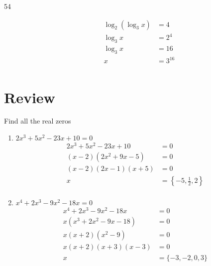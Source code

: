 \documentclass{exam}
\begin{document}
\begin{description}
        \item[54] 
          \begin{align*}
            \log_2 (\log_3 x) &= 4 \\
            \log_3 x          &= 2^4 \\
            \log_3 x          &= 16 \\
            x                 &= \boxed{3^{16}} \\
          \end{align*}

      \end{description}
    \fi

    \section{Review}

    Find all the real zeros
    \begin{enumerate}
      \item $2x^3 + 5x^2 - 23x + 10 = 0$
        \ifprintanswers
          \begin{align*}
            2x^3 + 5x^2 - 23x + 10                &= 0 \\
            (x - 2)\left( 2 x^2 + 9 x - 5 \right) &= 0 \\
            (x - 2)(2x - 1)(x + 5)                &= 0 \\
            x                                     &= \boxed{ \left\{ - 5, \frac{1}{2}, 2 \right\} } \\
          \end{align*}
        \fi

      \item $x^4 + 2x^3 - 9x^2 - 18x = 0$
        \ifprintanswers
          \begin{align*}
            x^4 + 2x^3 - 9x^2 - 18x               &= 0 \\
            x \left( x^3 + 2x^2 - 9x - 18 \right) &= 0 \\
            x (x + 2) \left( x^2 - 9 \right)      &= 0 \\
            x (x + 2) (x + 3)(x - 3)              &= 0 \\
            x                                     &= \boxed{ \{ -3, -2, 0, 3 \} } \\
          \end{align*}
        \fi

    \end{enumerate}
\end{document}
